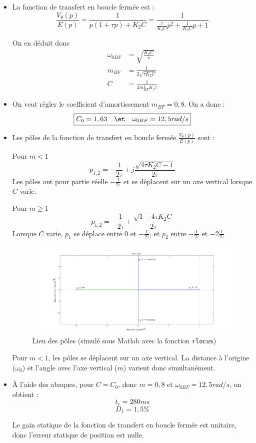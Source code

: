 \documentclass[../../Cours_M1.tex]{subfiles}
\begin{document}
\begin{itemize}\setlength{\itemsep}{10mm}
\item La fonction de transfert en boucle fermée est :
\[\frac{V_{\theta}(p)}{E(p)} = \frac{1}{p(1+\tau p) + K_2C} = \frac{1}{\frac{\tau}{K_2C}p^2 + \frac{1}{K_2C}p+1}\]

On en déduit donc
\begin{align*}
\omega_{0BF} & = \sqrt{\frac{K_2C}{\tau}} \\
m_{BF} & = \frac{1}{2\sqrt{\tau K_2C}} \\
C & = \frac{1}{4m_{BF}^2K_2\tau}
\end{align*}

\item On veut régler le coefficient d'amortissement $m_{BF}=0,8$. On a donc :
\[ \boxed{ C_0 = 1,63 \quad \et \quad \omega_{0BF} = 12,5 rad/s} \]

\item Les pôles de la fonction de transfert en boucle fermée $\frac{V_{\theta}(p)}{E(p)}$ sont :

\begin{multicols}{2}
Pour $m<1$
\[p_{1,2} = -\frac{1}{2\tau} \pm j \frac{\sqrt{4\tau K_2 C -1}}{2\tau} \]
Les pôles ont pour partie réelle $-\frac{1}{2\tau}$ et se déplacent sur un axe vertical lorsque $C$ varie.

Pour $m\geq 1$
\[p_{1,2} = -\frac{1}{2\tau} \pm \frac{\sqrt{1 - 4\tau K_2 C}}{2\tau} \]
Lorsque $C$ varie, $p_1$ se déplace entre 0 et $-\frac{1}{2\tau}$, et $p_2$ entre $-\frac{1}{2\tau}$ et $-2\frac{1}{2\tau}$
\end{multicols}

\begin{figure}[h!]
\centering
\includegraphics[scale=0.4]{rlocus.png}
\caption{Lieu des pôles (simulé sous Matlab avec la fonction \texttt{rlocus})}
\end{figure}

Pour $m<1$, les pôles se déplacent sur un axe vertical. La distance à l'origine ($\omega_0$) et l'angle avec l'axe vertical ($m$) varient donc simultanément.
 
\item À l'aide des abaques, pour $C=C_0$, donc $m=0,8$ et $\omega_{0BF} = 12,5 rad/s$, on obtient :
\[t_r = 280 ms \]
\[D_1 = 1,5\% \]

Le gain statique de la fonction de transfert en boucle fermée est unitaire, donc l'erreur statique de position est nulle.
\end{itemize}
\end{document}
